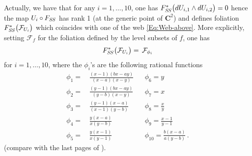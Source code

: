\documentclass[11pt]{amsart}
\begin{document}
 Actually, 
we have that for any $i=1,\ldots,10$, one has $F_{S\hspace{-0.03cm}S}^*\big( 
dU_{i,1}\wedge dU_{i,2}\big)=0$ hence the map $U_i\circ F_{S\hspace{-0.03cm}S}$ has rank 1 (at the generic point of $\mathbf C^2$) and 
 defines foliation $F_{S\hspace{-0.03cm}S}^*\big( \mathcal F_{U_i}\big)$ which coincides with one of the web \eqref{Eq:Web-above}. 
 More explicitly, setting $\mathcal F_f$ for the foliation defined by the level subsets of $f$, one has 
 $$
 F_{S\hspace{-0.03cm}S}^*\big( \mathcal F_{U_i}\big)
 = \,  
 \mathcal F_{ 
\phi_i}
 $$
 for $i=1,\ldots,10$, where the $\phi_i$'s are the following rational functions
 \begin{align*}%
\phi_1= &\,  \frac{(x-1)(bx-ay)}{(x-a)(x-y)}   && \phi_6= y 
\\
\phi_2=&\,  \frac{(y-1)(bx-ay)}{(y-b)(x-y)} 
&& \phi_7= x 
\\
 \phi_3=&\,  \frac{(y-1)(x-a)}{(x-1)(y-b)}
&& \phi_8=\frac{x}{y}
\\
  \phi_4=&\,  \frac{y(x-a)}{x(y-b)}
&& \phi_9=\frac{x-1}{y-1}
\\
 \phi_5=&\,  \frac{y(x-1)}{x(y-1)}
&& \phi_{10}=\frac{b(x-a)}{a(y-b)}\,.
 \end{align*}%
(compare with the last pages of \cite[\S4.5]{PirioAFST}). 
 
\end{document}

